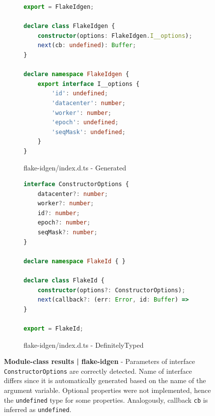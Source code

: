 \documentclass[a4paper,english,cleveref, autoref]{lipics-v2019}
\begin{document}
\begin{figure}[tp]
    \centering
    \begin{subfigure}{0.48\linewidth}
      \begin{lstlisting}[language=TypeScript]
export = FlakeIdgen;

declare class FlakeIdgen {
    constructor(options: FlakeIdgen.I__options);
    next(cb: undefined): Buffer;
}

declare namespace FlakeIdgen {
    export interface I__options {
        'id': undefined;
        'datacenter': number;
        'worker': number;
        'epoch': undefined;
        'seqMask': undefined;
    }
}
      \end{lstlisting}
      \caption{flake-idgen/index.d.ts - Generated}
    \end{subfigure}
    \hfill
    \begin{subfigure}{0.48\linewidth}
      \begin{lstlisting}[language=TypeScript]
interface ConstructorOptions {
    datacenter?: number;
    worker?: number;
    id?: number;
    epoch?: number;
    seqMask?: number;
}

declare namespace FlakeId { }

declare class FlakeId {
    constructor(options?: ConstructorOptions);
    next(callback?: (err: Error, id: Buffer) => void): Buffer;
}

export = FlakeId;        
      \end{lstlisting}
      \caption{flake-idgen/index.d.ts - DefinitelyTyped}
    \end{subfigure}

    \caption{\textbf{Module-class results | flake-idgen} - Parameters of interface \lstinline{ConstructorOptions} are correctly detected. Name of interface differs since it is automatically generated based on the name of the argument variable. Optional properties were not implemented, hence the \lstinline{undefined} type for some properties. Analogously, callback \lstinline{cb} is inferred as \lstinline{undefined}.}
    \label{fig:experiments-results-module-class-flake-idgen}
\end{figure}
\end{document}
